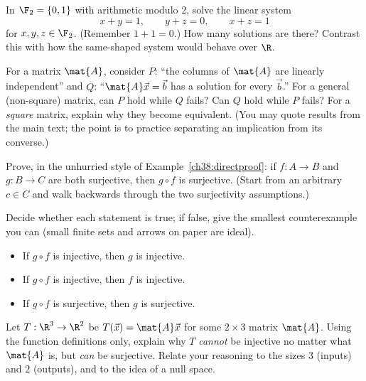 \begin{exercise}
In $\F_2 = \{0,1\}$ with arithmetic modulo $2$, solve the linear system
\[
  x + y = 1, \qquad y + z = 0, \qquad x + z = 1
\]
for $x,y,z \in \F_2$. (Remember $1+1 = 0$.) How many solutions are there? Contrast this
with how the same-shaped system would behave over $\R$.
\end{exercise}

\begin{exercise}
For a matrix $\mat{A}$, consider $P$: ``the columns of $\mat{A}$ are linearly independent''
and $Q$: ``$\mat{A}\vec{x} = \vec{b}$ has a solution for every $\vec{b}$.'' For a general
(non-square) matrix, can $P$ hold while $Q$ fails? Can $Q$ hold while $P$ fails? For a
\emph{square} matrix, explain why they become equivalent. (You may quote results from the
main text; the point is to practice separating an implication from its converse.)
\end{exercise}

\begin{exercise}
Prove, in the unhurried style of Example~\ref{ch38:directproof}: if $f:A\to B$ and
$g:B\to C$ are both surjective, then $g\circ f$ is surjective. (Start from an arbitrary
$c \in C$ and walk backwards through the two surjectivity assumptions.)
\end{exercise}

\begin{exercise}
Decide whether each statement is true; if false, give the smallest counterexample you can
(small finite sets and arrows on paper are ideal).
\begin{itemize}
  \item[(a)] If $g\circ f$ is injective, then $g$ is injective.
  \item[(b)] If $g\circ f$ is injective, then $f$ is injective.
  \item[(c)] If $g\circ f$ is surjective, then $g$ is surjective.
\end{itemize}
\end{exercise}

\begin{exercise}
Let $T:\R^3 \to \R^2$ be $T(\vec{x}) = \mat{A}\vec{x}$ for some $2\times 3$ matrix
$\mat{A}$. Using the function definitions only, explain why $T$ \emph{cannot} be injective
no matter what $\mat{A}$ is, but \emph{can} be surjective. Relate your reasoning to the
sizes $3$ (inputs) and $2$ (outputs), and to the idea of a null space.
\end{exercise}
